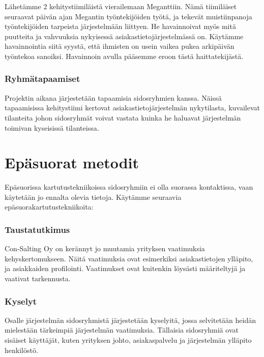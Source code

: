             Lähetämme 2 kehitystiimiläistä vierailemaan  Meganttiin. Nämä tiimiläiset seuraavat päivän ajan Megantin työntekijöiden työtä, ja tekevät 
            muistiinpanoja työntekijöiden tarpeista järjestelmään liittyen. He havainnoivat myös mitä puutteita ja vahvuuksia nykyisessä asiakastietojärjestelmässä on.
            Käytämme havainnointia siitä syystä, että ihmisten on usein vaikea pukea arkipäivän työntekoa sanoiksi. Havainnoin avulla pääsemme eroon tästä haittatekijästä.


        \subsubsection*{Ryhmätapaamiset}

            Projektin aikana järjestetään tapaamisia sidosryhmien kanssa. Näissä tapaamisissa kehitystiimi kertovat asiakastietojärjestelmän nykytilasta, kuvailevat tilanteita 
            johon sidosryhmät voivat vastata kuinka he haluavat järjestelmän toimivan kyseisissä tilanteissa.


    \section*{Epäsuorat metodit}

        Epäsuorissa kartutustekniikoissa sidosryhmiin ei olla suorassa kontaktissa, vaan käytetään jo ennalta olevia tietoja.
        Käytämme seuraavia epäsuorakartutustekniikoita:

        \subsubsection*{Taustatutkimus}

        Con-Salting Oy on kerännyt jo muutamia yrityksen vaatimuksia kehyskertomukseen. 
        Näitä vaatimuksia ovat esimerkiksi asiakastietojen ylläpito, ja asiakkaiden profilointi.
        Vaatimukset ovat kuitenkin löysästi määriteltyjä ja vaativat tarkennusta.

        \subsubsection{Kyselyt}

        Osalle järjestelmän sidosryhmistä järjestetään kyselyitä, jossa selvitetään heidän mielestään tärkeimpiä järjestelmän vaatimuksia.
        Tällaisia sidosryhmiä ovat sisäiset käyttäjät, kuten yrityksen johto, asiakaspalvelu ja järjestelmän ylläpito henkilöstö.

